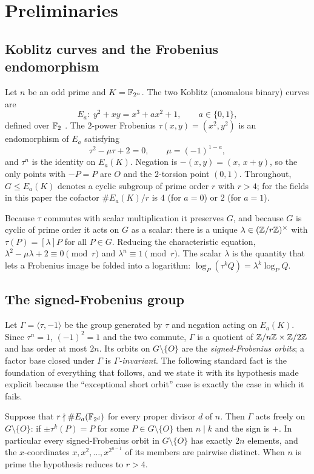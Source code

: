 \section{Preliminaries}
\label{sec:prelim}

\subsection{Koblitz curves and the Frobenius endomorphism}

Let $n$ be an odd prime and $K=\mathbb{F}_{2^n}$. The two Koblitz (anomalous binary)
curves are
\[
  E_a:\; y^2+xy = x^3+ax^2+1,\qquad a\in\{0,1\},
\]
defined over $\mathbb{F}_2$ \citep{koblitz1992}. The $2$-power Frobenius
$\tau(x,y)=(x^2,y^2)$ is an endomorphism of $E_a$ satisfying
\[
  \tau^2-\mu\tau+2=0,\qquad \mu=(-1)^{1-a},
\]
and $\tau^n$ is the identity on $E_a(K)$. Negation is
$-(x,y)=(x,\,x+y)$, so the only points with $-P=P$ are $O$ and the
$2$-torsion point $(0,1)$. Throughout, $G\le E_a(K)$ denotes a cyclic
subgroup of prime order $r$ with $r>4$; for the fields in this paper the
cofactor $\#E_a(K)/r$ is $4$ (for $a=0$) or $2$ (for $a=1$).

Because $\tau$ commutes with scalar multiplication it preserves $G$, and
because $G$ is cyclic of prime order it acts on $G$ as a scalar:
there is a unique $\lambda\in(\mathbb{Z}/r\mathbb{Z})^\times$ with
$\tau(P)=[\lambda]P$ for all $P\in G$. Reducing the characteristic
equation, $\lambda^2-\mu\lambda+2\equiv 0 \pmod r$ and
$\lambda^n\equiv 1\pmod r$. The scalar $\lambda$ is the quantity that
lets a Frobenius image be folded into a logarithm:
$\log_P(\tau^k Q)=\lambda^k\log_P Q$.

\subsection{The signed-Frobenius group}

Let $\Gamma=\langle\tau,-1\rangle$ be the group generated by $\tau$ and
negation acting on $E_a(K)$. Since $\tau^n=1$, $(-1)^2=1$ and the two
commute, $\Gamma$ is a quotient of $\mathbb{Z}/n\mathbb{Z}\times\mathbb{Z}/2\mathbb{Z}$ and has
order at most $2n$. Its orbits on $G\setminus\{O\}$ are the
\emph{signed-Frobenius orbits}; a factor base closed under $\Gamma$ is
\emph{$\Gamma$-invariant}. The following standard fact is the
foundation of everything that follows, and we state it with its
hypothesis made explicit because the ``exceptional short orbit'' case is
exactly the case in which it fails.

\begin{lemma}
\label{lem:free}
Suppose that $r\nmid\#E_a(\mathbb{F}_{2^d})$ for every proper divisor $d$ of
$n$. Then $\Gamma$ acts freely on $G\setminus\{O\}$: if
$\pm\tau^k(P)=P$ for some $P\in G\setminus\{O\}$ then $n\mid k$ and the
sign is $+$. In particular every signed-Frobenius orbit in
$G\setminus\{O\}$ has exactly $2n$ elements, and the
$x$-coordinates $x,x^2,\dots,x^{2^{n-1}}$ of its members are pairwise
distinct. When $n$ is prime the hypothesis reduces to $r>4$.
\end{lemma}

